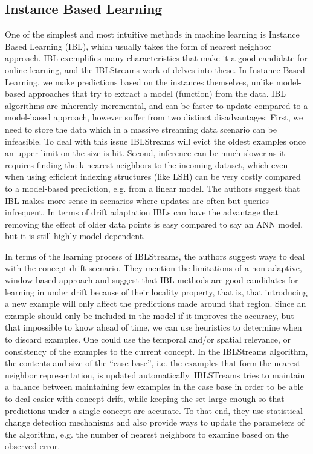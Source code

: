 \subsection*{Instance Based Learning}
One of the simplest and most intuitive methods in machine learning
is Instance Based Learning (IBL), which usually takes the form of
nearest neighbor approach. IBL exemplifies many characteristics
that make it a good candidate for online learning, and the
IBLStreams work of \cite{ibl-streams} delves into these.
In Instance Based Learning, we make predictions based on the instances themselves, unlike
model-based approaches that try to extract a model (function) from the
data. IBL algorithms are inherently incremental, and can be faster to
update compared to a model-based approach, however suffer from two
distinct disadvantages: First, we need to store the data which in a
massive streaming data scenario can be infeasible. To deal with this
issue IBLStreams will evict the oldest examples once an upper limit on
the size is hit. Second, inference can be much slower as it requires
finding the k nearest neighbors to the incoming dataset, which even when
using efficient indexing structures (like LSH) can be very costly
compared to a model-based prediction, e.g. from a linear model. The
authors suggest that IBL makes more sense in scenarios where updates are
often but queries infrequent. In terms of drift adaptation IBLs can have
the advantage that removing the effect of older data points is easy
compared to say an ANN model, but it is still highly model-dependent.

In terms of the learning process of IBLStreams, the authors suggest ways to deal with
the concept drift scenario. They mention the limitations of a non-adaptive, window-based
approach and suggest that IBL methods are good candidates for learning in
under drift because of their locality property, that is, that introducing
a new example will only affect the predictions made around that region.
Since an example should only be included in the model if it improves the
accuracy, but that impossible to know ahead of time, we can use heuristics
to determine when to discard examples. One could use the temporal and/or spatial
relevance, or consistency of the examples to the current concept.
In the IBLStreams algorithm, the contents and size of the ``case base'',
i.e. the examples that form the nearest neighbor representation, is
updated automatically. IBLSTreams tries to maintain a balance between
maintaining few examples in the case base in order to be able to deal
easier with concept drift, while keeping the set large enough so that
predictions under a single concept are accurate. To that end, they
use statistical change detection mechanisms and also provide ways
to update the parameters of the algorithm, e.g. the number of nearest
neighbors to examine based on the observed error.

